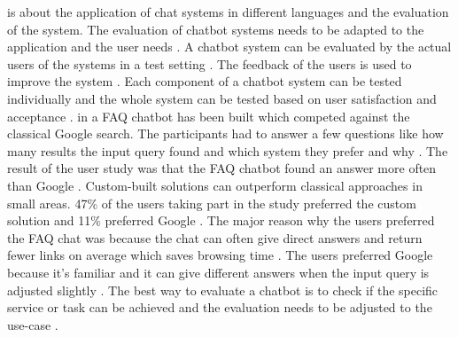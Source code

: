 \citet{evaluateChatbotsShawar2007} is about the application of chat systems in different languages and the evaluation of the system.
The evaluation of chatbot systems needs to be adapted to the application and the user needs \cite{evaluateChatbotsShawar2007}.
A chatbot system can be evaluated by the actual users of the systems in a test setting \cite{evaluateChatbotsShawar2007}.
The feedback of the users is used to improve the system \cite{evaluateChatbotsShawar2007}. 
Each component of a chatbot system can be tested individually and the whole system can be tested based on user 
satisfaction and acceptance \cite{evaluateChatbotsShawar2007}.
in \citet{evaluateChatbotsShawar2007} a FAQ chatbot has been built which competed against the classical Google search.
The participants had to answer a few questions like how many results the input query found and which system they prefer 
and why \cite{evaluateChatbotsShawar2007}. 
The result of the user study was that the FAQ chatbot found an answer more often than Google \cite{evaluateChatbotsShawar2007}.
Custom-built solutions can outperform classical approaches in small areas.
47\% of the users taking part in the study preferred the custom solution and 11\% preferred Google \cite{evaluateChatbotsShawar2007}.
The major reason why the users preferred the FAQ chat was because the chat can often give direct answers and return 
fewer links on average which saves browsing time \cite{evaluateChatbotsShawar2007}. 
The users preferred Google because it's familiar and it can give different answers when the input query is adjusted 
slightly \cite{evaluateChatbotsShawar2007}.
The best way to evaluate a chatbot is to check if the specific service or task can be achieved and the evaluation 
needs to be adjusted to the use-case \cite{evaluateChatbotsShawar2007}.

